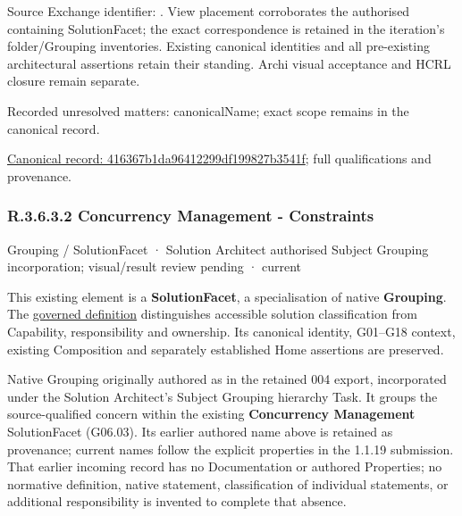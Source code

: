 Source Exchange identifier: \texttt{}. View placement corroborates
the authorised containing SolutionFacet; the exact correspondence is retained in the
iteration's folder/Grouping inventories. Existing canonical identities and all
pre-existing architectural assertions retain their standing. Archi visual
acceptance and HCRL closure remain separate.


{\small Recorded unresolved matters: canonicalName; exact scope remains in the canonical record.}\par
{\footnotesize \href{../../../../../../../continuum/grouping/416367b1da96412299df199827b3541f.md}{Canonical record: 416367b1da96412299df199827b3541f}; full qualifications and provenance.}\par
\subsubsection*{R.3.6.3.2 Concurrency Management - Constraints}
\label{navigation:R.3.6.3.2}

\label{element:d90a28dcf8294c89a7a06022a3617aba}
{\small Grouping / SolutionFacet · Solution Architect authorised Subject Grouping incorporation; visual/result review pending · current}\par

This existing element is a \textbf{SolutionFacet}, a specialisation of native
\textbf{Grouping}. The \href{\detokenize{../../../../../../../governance/continuum-representation.md#solutionfacet-classification--1119-candidate}}{governed definition}
distinguishes accessible solution classification from Capability, responsibility
and ownership. Its canonical identity, G01–G18 context, existing Composition
and separately established Home assertions are preserved.



Native Grouping originally authored as \texttt{} in the retained 004 export,
incorporated under the Solution Architect's Subject Grouping hierarchy Task.
It groups the source-qualified \texttt{} concern within
the existing \textbf{Concurrency Management} SolutionFacet (G06.03). Its earlier authored name above is retained as provenance; current names
follow the explicit properties in the 1.1.19 submission.
That earlier incoming record has no Documentation or authored Properties; no normative
definition, native statement, classification of individual statements, or
additional responsibility is invented to complete that absence.



